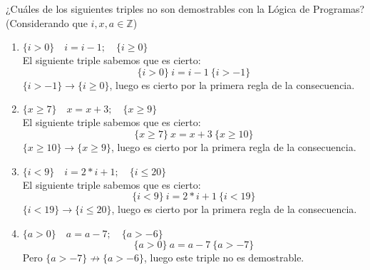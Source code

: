 \begin{ejercicio}
    ¿Cuáles de los siguientes triples no son demostrables con la Lógica de Programas?
    (Considerando que $i,x,a \in \mathbb{Z}$)
    \begin{enumerate}
        \item $\{i > 0\} \quad i = i - 1; \quad \{i \geq 0\}$\\
            El siguiente triple sabemos que es cierto:
            \begin{equation*}
                \{i>0\}\ i=i-1\ \{i>-1\} 
            \end{equation*}
            $\{i>-1\}\rightarrow \{i\geq 0\}$, luego es cierto por la primera regla de la consecuencia.
        \item $\{x \geq 7\} \quad x = x + 3; \quad \{x \geq 9\}$\\
            El siguiente triple sabemos que es cierto:    
            \begin{equation*}
                \{x\geq 7\}\ x=x+3\ \{x\geq 10\}
            \end{equation*}
            $\{x\geq 10\}\rightarrow\{x\geq 9\}$, luego es cierto por la primera regla de la consecuencia.
        \item $\{i < 9\} \quad i = 2 \ast i + 1; \quad \{ i \leq 20\}$\\
            El siguiente triple sabemos que es cierto:
            \begin{equation*}
                \{i<9\}\ i=2\ast i+1\ \{i<19\}
            \end{equation*}
            $\{i<19\}\rightarrow\{i\leq 20\}$, luego es cierto por la primera regla de la consecuencia.
        \item $\{a > 0\} \quad a = a - 7; \quad \{a > -6\}$\\
            \begin{equation*}
                \{a>0\}\ a=a-7\ \{a>-7\}
            \end{equation*}
            Pero $\{a>-7\}\not\rightarrow\{a>-6\}$, luego este triple no es demostrable.
    \end{enumerate}
\end{ejercicio}

